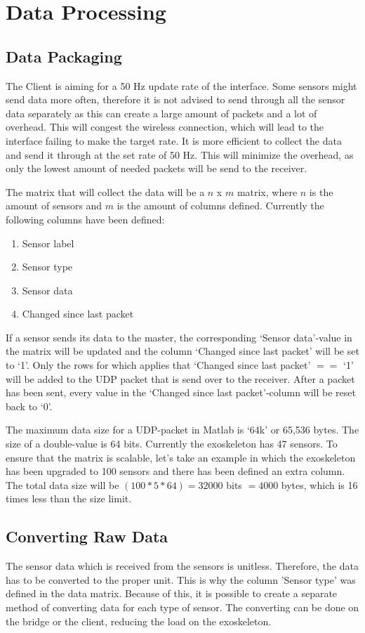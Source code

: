\section{Data Processing}\label{sec:dataproc}
\subsection{Data Packaging}
The Client is aiming for a 50 Hz update rate of the interface. Some sensors might send data more often, therefore it is not advised to send through all the sensor data separately as this can create a large amount of packets and a lot of overhead. This will congest the wireless connection, which will lead to the interface failing to make the target rate. It is more efficient to collect the data and send it through at the set rate of 50 Hz. This will minimize the overhead, as only the lowest amount of needed packets will be send to the receiver.

The matrix that will collect the data will be a $n$ x $m$ matrix, where $n$ is the amount of sensors and $m$ is the amount of columns defined. Currently the following columns have been defined:\\
\begin{enumerate}
	\item Sensor label
	\item Sensor type
	\item Sensor data
	\item Changed since last packet
\end{enumerate}
If a sensor sends its data to the master, the corresponding `Sensor data'-value in the matrix will be updated and the column `Changed since last packet' will be set to `1'. Only the rows for which applies that `Changed since last packet' $==$ `1' will be added to the UDP packet that is send over to the receiver. After a packet has been sent, every value in the `Changed since last packet'-column will be reset back to `0'.

The maximum data size for a UDP-packet in Matlab is `64k' or 65,536 bytes. The size of a double-value is 64 bits. Currently the exoskeleton has 47 sensors. To ensure that the matrix is scalable, let's take an example in which the exoskeleton has been upgraded to 100 sensors and there has been defined an extra column. The total data size will be $(100*5*64) = 32000$ bits $= 4000$ bytes, which is 16 times less than the size limit. 

\subsection{Converting Raw Data}
The sensor data which is received from the sensors is unitless. Therefore, the data has to be converted to the proper unit. This is why the column 'Sensor type' was defined in the data matrix. Because of this, it is possible to create a separate method of converting data for each type of sensor. The converting can be done on the bridge or the client,  reducing the load on the exoskeleton.